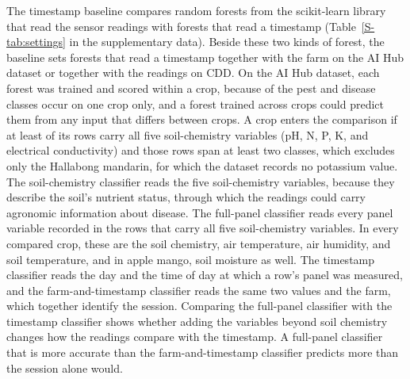 \documentclass[preprint,12pt,authoryear,nopreprintline]{elsarticle}
\begin{document}
The timestamp baseline compares random forests \citep{breiman2001random} from the
scikit-learn library \citep{pedregosa2011scikit} that read the sensor readings with
forests that read a timestamp (Table~\ref{S-tab:settings} in the supplementary data). Beside
these two kinds of forest, the baseline sets forests that read a timestamp together with
the farm on the AI Hub dataset or together with the readings on CDD. On the AI Hub dataset, each forest was trained and
scored within a crop, because \numSingleCropClasses{} of the \numClasses{} pest and
disease classes occur on one crop only, and a forest trained across crops could predict
them from any input that differs between crops. A crop
enters the comparison if at least \timestampMinRows{} of its rows carry all five
soil-chemistry variables (pH, N, P, K, and electrical conductivity) and those rows span
at least two classes, which excludes only the Hallabong mandarin, for which the dataset records no potassium value. The soil-chemistry classifier reads the five soil-chemistry
variables, because they describe the soil's nutrient status, through which the readings could
carry agronomic information about disease. The full-panel classifier reads every panel variable recorded in the rows that carry
all five soil-chemistry variables. In every compared crop, these are the soil chemistry,
air temperature, air humidity, and soil temperature, and in apple mango, soil moisture
as well.  The timestamp
classifier reads the day and the time of day at which a row's panel was measured, and
the farm-and-timestamp classifier reads the same two values and the farm, which
together identify the session. Comparing the full-panel classifier with the
timestamp classifier shows whether adding the variables beyond soil chemistry changes
how the readings compare with the timestamp. A full-panel classifier that is more accurate than the farm-and-timestamp
classifier predicts more than the session alone would.
\end{document}
